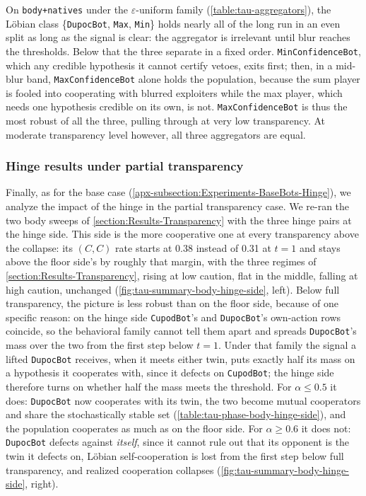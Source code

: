 \documentclass[twoside,11pt]{article}
\begin{document}
On \texttt{body+natives} under the $\varepsilon$-uniform family (\cref{table:tau-aggregators}), the Löbian class \{\texttt{DupocBot}, \texttt{Max}, \texttt{Min}\} holds nearly all of the long run in an even split as long as the signal is clear: the aggregator is irrelevant until blur reaches the thresholds. Below that the three separate in a fixed order. \texttt{MinConfidenceBot}, which any credible hypothesis it cannot certify vetoes, exits first; then, in a mid-blur band, \texttt{MaxConfidenceBot} alone holds the population, because the sum player is fooled into cooperating with blurred exploiters while the max player, which needs one hypothesis credible on its own, is not. \texttt{MaxConfidenceBot} is thus the most robust of all the three, pulling through at very low transparency. At moderate transparency level however, all three aggregators are equal. 




\subsubsection{Hinge results under partial transparency}
\label{apx-subsubsection:Experiments-Transparency-Hinge}
Finally, as for the base case (\cref{apx-subsection:Experiments-BaseBots-Hinge}), we analyze the impact of the hinge in the partial transparency case. We re-ran the two body sweeps of \cref{section:Results-Transparency} with the three hinge pairs at the hinge side. This side is the more cooperative one at every transparency above the collapse: its $(C,C)$ rate starts at 0.38 instead of 0.31 at $t = 1$ and stays above the floor side's by roughly that margin, with the three regimes of \cref{section:Results-Transparency}, rising at low caution, flat in the middle, falling at high caution, unchanged (\cref{fig:tau-summary-body-hinge-side}, left). Below full transparency, the picture is less robust than on the floor side, because of one specific reason: on the hinge side \texttt{CupodBot}'s and \texttt{DupocBot}'s own-action rows coincide, so the behavioral family cannot tell them apart and spreads \texttt{DupocBot}'s mass over the two from the first step below $t = 1$. Under that family the signal a lifted \texttt{DupocBot} receives, when it meets either twin, puts exactly half its mass on a hypothesis it cooperates with, since it defects on \texttt{CupodBot}; the hinge side therefore turns on whether half the mass meets the threshold. For $\alpha \le 0.5$ it does: \texttt{DupocBot} now cooperates with its twin, the two become mutual cooperators and share the stochastically stable set (\cref{table:tau-phase-body-hinge-side}), and the population cooperates as much as on the floor side. For $\alpha \ge 0.6$ it does not: \texttt{DupocBot} defects against \emph{itself}, since it cannot rule out that its opponent is the twin it defects on, Löbian self-cooperation is lost from the first step below full transparency, and realized cooperation collapses (\cref{fig:tau-summary-body-hinge-side}, right).
\end{document}
